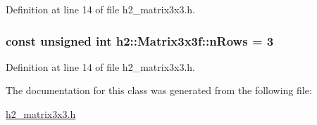 Definition at line 14 of file h2\-\_\-matrix3x3.\-h.

\hypertarget{classh2_1_1_matrix3x3f_ae3dad43b5f083f6850fa48ce346e29c1}{
\subsubsection[{n\-Rows}]{\setlength{\rightskip}{0pt plus 5cm}const unsigned int h2\-::\-Matrix3x3f\-::n\-Rows = 3\hspace{0.3cm}{\ttfamily [static]}}}\label{classh2_1_1_matrix3x3f_ae3dad43b5f083f6850fa48ce346e29c1}


Definition at line 14 of file h2\-\_\-matrix3x3.\-h.



The documentation for this class was generated from the following file\-:\begin{DoxyCompactItemize}
\item 
\hyperlink{h2__matrix3x3_8h}{h2\-\_\-matrix3x3.\-h}\end{DoxyCompactItemize}
